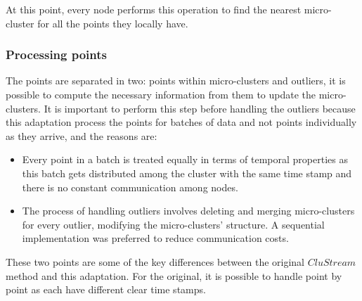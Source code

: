 % 
% 
% 
At this point, every node performs this operation to find the nearest micro-cluster for all the points they locally have.



\subsubsection{Processing points}\label{procpoints}

The points are separated in two: points within micro-clusters and outliers, it is possible to compute the necessary information from them to update the micro-clusters. It is important to perform this step before handling the outliers because this adaptation process the points for batches of data and not points individually as they arrive, and the reasons are:

\begin{itemize}
 \item Every point in a batch is treated equally in terms of temporal properties as this batch gets distributed among the cluster with the same time stamp and there is no constant communication among nodes.
\item The process of handling outliers involves deleting and merging micro-clusters for every outlier, modifying the micro-clusters' structure. A sequential implementation was preferred to reduce communication costs.
\end{itemize}

These two points are some of the key differences between the original $CluStream$ method and this adaptation. For the original, it is possible to handle point by point as each have different clear time stamps.


